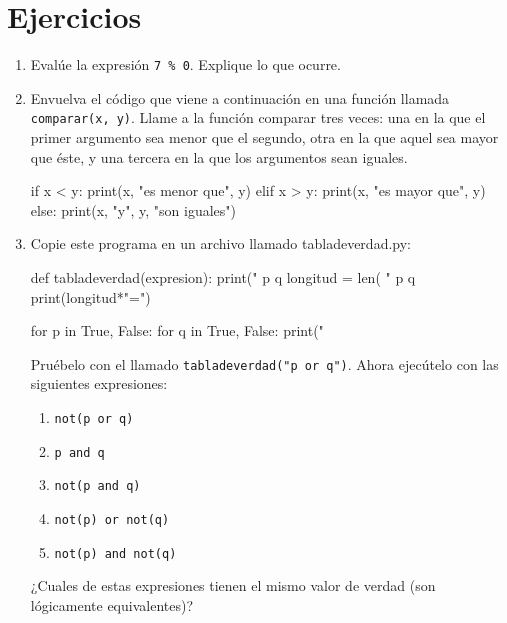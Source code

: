\section{Ejercicios}
\begin{enumerate}
\item Evalúe la expresión \verb+7 % 0+. Explique lo que ocurre.
\item Envuelva el código que viene a continuación en una función llamada
\verb+comparar(x, y)+. Llame a la función comparar tres veces: una
en la que el primer argumento sea menor que el segundo, otra en la
que aquel sea mayor que éste, y una tercera en la que los argumentos
sean iguales. 
\begin{pythoncode}
 if x < y:
    print(x, "es menor que", y)
 elif x > y:
    print(x, "es mayor que", y)
 else:
    print(x, "y", y, "son iguales")
\end{pythoncode}
\item Copie este programa en un archivo llamado tabladeverdad.py: 
\begin{pythoncode}
def tabladeverdad(expresion):
    print(" p      q      %
    longitud = len( " p      q      %
    print(longitud*"=")

    for p in True, False:
        for q in True, False:
            print("%
\end{pythoncode}

Pruébelo con el llamado \verb+tabladeverdad("p or q")+. Ahora ejecútelo
con las siguientes expresiones: 
\begin{enumerate}
\item \texttt{\textquotedbl{}not(p or q)\textquotedbl{}} 
\item \texttt{\textquotedbl{}p and q\textquotedbl{}} 
\item \texttt{\textquotedbl{}not(p and q)\textquotedbl{}} 
\item \texttt{\textquotedbl{}not(p) or not(q)\textquotedbl{}} 
\item \texttt{\textquotedbl{}not(p) and not(q)\textquotedbl{} }
\end{enumerate}
¿Cuales de estas expresiones tienen el mismo valor de verdad (son
lógicamente equivalentes)?
\end{enumerate}


